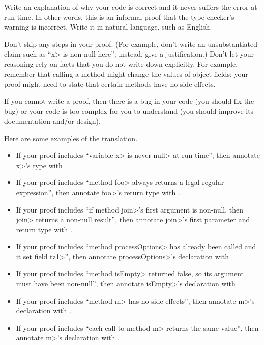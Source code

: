 Write an explanation of why your code is correct and it
never suffers the error at run time.  In other words, this is an informal proof
that the type-checker's warning is incorrect.  Write it in natural language,
such as English.

Don't skip any steps in your proof.
(For example, don't write an unsubstantiated claim such as ``\<x> is
non-null here''; instead, give a justification.)
Don't let your reasoning rely on
facts that you do not write down explicitly.  For example, remember that
calling a method might change the values of object fields; your proof
might need to state that certain methods have no side effects.

If you cannot write a proof, then there is a bug
in your code (you should fix the bug) or your code is too complex for you
to understand (you should improve its documentation and/or design).


Here are some examples of the translation.

\begin{itemize}
\item
  If your proof includes ``variable \<x> is never \<null>
  at run time'', then annotate \<x>'s type with
  .
\item
  If your proof
  includes ``method \<foo> always returns a legal regular expression'',
  then annotate \<foo>'s return type with
  .
\item
  If your proof includes ``if method \<join>'s first argument is
  non-null, then \<join> returns a non-null result'', then annotate
  \<join>'s first parameter and return type with
  .
\item
  If your proof includes ``method \<processOptions> has already been called and it
  set field \<tz1>'', then annotate \<processOptions>'s declaration with
  .
\item
  If your proof includes ``method \<isEmpty> returned false, so its
  argument must have been non-null'', then annotate \<isEmpty>'s
  declaration with
  .
\item
  If your proof includes ``method \<m> has no side effects'',
  then annotate \<m>'s declaration with
  .
\item
  If your proof includes ``each call to method \<m> returns the same value'',
  then annotate \<m>'s declaration with
  .
\end{itemize}

